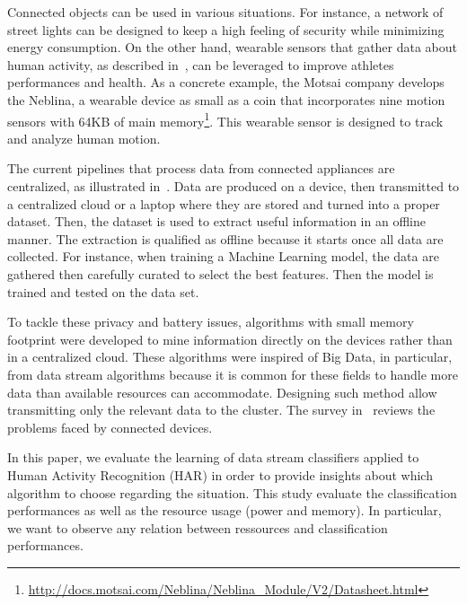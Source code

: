 Connected objects can be used in various
situations.  For instance, a network of street
lights can be designed to keep a high feeling of
security while minimizing energy consumption.  On
the other hand, wearable sensors that gather data
about human activity, as described
in~\cite{recofit}, can be leveraged to improve
athletes performances and health. 
As a concrete example, the Motsai company develops
the Neblina, a wearable device as small as a coin
that incorporates nine motion sensors with 64KB
of main
memory\footnote{\url{http://docs.motsai.com/Neblina/Neblina_Module/V2/Datasheet.html}}.
This wearable sensor is designed to track and
analyze human motion.

The current pipelines that process data from
connected appliances are centralized, as
illustrated in~\cite{recofit}.  Data are produced
on a device, then transmitted to a centralized
cloud or a laptop where they are stored and turned
into a proper dataset. Then, the dataset is used
to extract useful information in an offline
manner.  The extraction is qualified as offline
because it starts once all data are collected. For
instance, when training a Machine Learning model,
the data are gathered then carefully curated to select
the best features. Then the model is trained and
tested on the data set.

To tackle these privacy and battery issues,
algorithms with small memory footprint were
developed to mine information directly on the
devices rather than in a centralized cloud.  These
algorithms were inspired of Big Data, in
particular, from data stream algorithms because it
is common for these fields to handle more data
than available resources can accommodate.
Designing such method allow transmitting only the
relevant data to the cluster. The survey
in~\cite{kejariwal2015} reviews the problems faced
by connected devices.


In this paper, we evaluate the learning of
data stream classifiers applied to Human
Activity Recognition (HAR) in order to provide insights
about which algorithm to choose regarding the
situation.  This study evaluate the classification
performances as well as the resource usage (power
and memory). In particular, we want to observe any
relation between ressources and classification
performances. 



